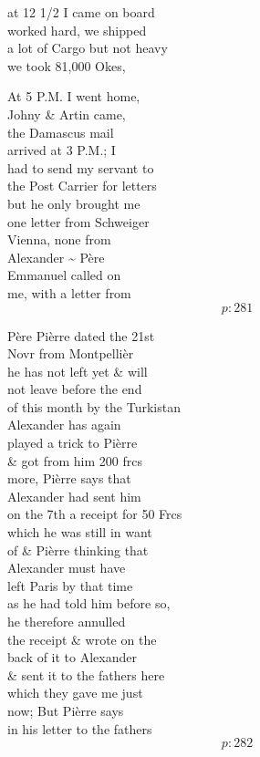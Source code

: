 \documentclass{report}
\begin{document}
	\par{
 	at 12 1/2 I came on board\ \\worked hard, we shipped\ \\a lot of Cargo but not heavy\ \\we took 81,000 Okes,\ \\
	}

	\par{
 	At 5 P.M. I went home,\ \\Johny \& Artin came,\ \\the Damascus mail\ \\arrived at 3 P.M.; I\ \\had to send my servant to\ \\the Post Carrier for letters\ \\but he only brought me\ \\one letter from Schweiger\ \\Vienna, none from\ \\Alexander \~{} Père\ \\Emmanuel called on\ \\me, with a letter from\ \\
  \[p: 281 \]

	}



	\par{
 	Père Pièrre dated the 21st\ \\Novr from Montpellièr\ \\he has not left yet \& will\ \\not leave before the end\ \\of this month by the Turkistan\ \\Alexander has again\ \\played a trick to Pièrre\ \\\& got from him 200 frcs\ \\more, Pièrre says that\ \\Alexander had sent him\ \\on the 7th a receipt for 50 Frcs\ \\which he was still in want\ \\of \& Pièrre thinking that\ \\Alexander must have\ \\left Paris by that time\ \\as he had told him before so,\ \\he therefore annulled\ \\the receipt \& wrote on the\ \\back of it to Alexander\ \\\& sent it to the fathers here\ \\which they gave me just\ \\now; But Pièrre says\ \\in his letter to the fathers\ \\
  \[p: 282 \]

	}
\end{document}
